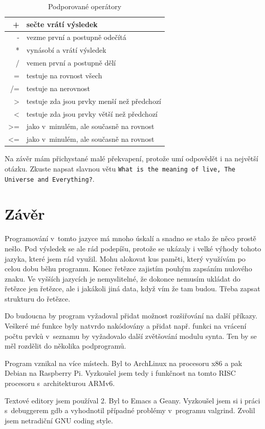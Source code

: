 \documentclass[a4paper, 12pt]{article}
\begin{document}
\begin{table}
\centering
\begin{tabular}{|r|l|}
\hline
+ & sečte vrátí výsledek\\ \hline
- & vezme první a postupně odečítá\\ \hline
* & vynásobí a vrátí výsledek\\ \hline
/ & vemen první a postupně dělí\\ \hline
= & testuje na rovnost všech\\ \hline
/= & testuje na nerovnost\\ \hline
\textgreater{} & testuje zda jsou prvky menší než předchozí\\ \hline
\textless{} & testuje zda jsou prvky větší než předchozí\\ \hline
\textgreater{=} & jako v~minulém, ale současně na rovnost\\ \hline
\textless{=} & jako v~minulém, ale současně na rovnost\\ \hline
\end{tabular}
\caption{Podporované operátory}
\label{tab:op}
\end{table}

Na závěr mám přichystané malé překvapení, protože umí odpovědět i
na největší otázku. Zkuste napsat slavnou větu \texttt{What is the
meaning of live, The Universe and Everything?}.

\section{Závěr}
Programování v~tomto jazyce má mnoho úskalí a snadno se stalo že něco
prostě nešlo. Pod výsledek se ale rád podepíšu, protože se ukázaly i velké
výhody tohoto jazyka, které jsem rád využil. Mohu alokovat kus paměti,
který využívám po celou dobu běhu programu. Konec řetězce zajistím pouhým
zapsáním nulového znaku. Ve vyšších jazycích je nemyslitelné, že dokonce
nemusím ukládat do řetězce jen řetězce, ale i jakákoli jiná data, když vím
že tam budou. Třeba zapsat strukturu do řetězce.

Do budoucna by program vyžadoval přidat možnost rozšiřování na další
příkazy. Veškeré mé funkce byly natvrdo nakódovány a přidat např.
funkci na vrácení počtu prvků v~seznamu by vyžadovalo další zvětšování
modulu \textsf{synta}. Ten by se měl rozdělit do několika podprogramů.

Program vznikal na více místech. Byl to ArchLinux na procesoru x86 a
pak Debian na Raspberry Pi. Vyzkoušel jsem tedy i funkčnost na tomto
RISC procesoru s~architekturou ARMv6.

Textové editory jsem používal 2. Byl to Emacs a Geany. Vyzkoušel jsem si i
práci s~debuggerem \textsf{gdb} a vyhodnotil případné problémy
v~programu \textsf{valgrind}. Zvolil jsem netradiční GNU coding style.

\nocite{wiki:cpro}
\nocite{pred:c}

\listoftables
\end{document}

